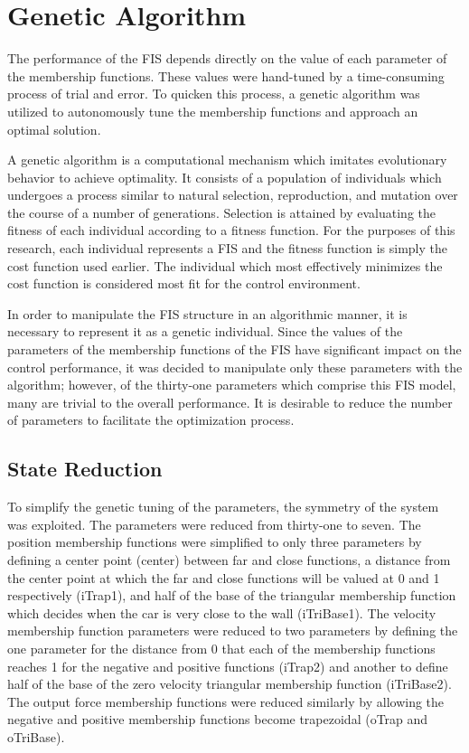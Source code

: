 \section{Genetic Algorithm}\label{s:ga} The performance of the FIS depends directly
on the value of each parameter of the membership functions. These values were hand-tuned by a time-consuming
process of trial and error. To quicken this process, a genetic algorithm was utilized to autonomously tune the
membership functions and approach an optimal solution. 

      A genetic algorithm is a computational mechanism which imitates evolutionary behavior to achieve
      optimality. It consists of a population of individuals which undergoes a process similar to natural
      selection, reproduction, and mutation over the course of a number of generations\cite{cordon:01bk}.
      Selection is attained by evaluating the fitness of each individual according to a fitness function. For
      the purposes of this research, each individual represents a FIS and the fitness function is simply the
      cost function used earlier. The individual which most effectively minimizes the cost function is
      considered most fit for the control environment.
      
      In order to manipulate the FIS structure in an algorithmic manner, it is necessary to represent it as a
      genetic individual. Since the values of the parameters of the membership functions of the FIS have
      significant impact on the control performance, it was decided to manipulate only these parameters with
      the algorithm; however, of the thirty-one parameters which comprise this FIS model, many are trivial to
      the overall performance. It is desirable to reduce the number of parameters to facilitate the
      optimization process.

\subsection{State Reduction} To simplify the genetic tuning of the parameters, the symmetry of the system
was exploited. The parameters were reduced from thirty-one to seven. The position membership functions were
simplified to only three parameters by defining a center point (center) between far and close functions, a
distance from the center point at which the far and close functions will be valued at 0 and 1 respectively
(iTrap1), and half of the base of the triangular membership function which decides when the car is very close
to the wall (iTriBase1). The velocity membership function parameters were reduced to two parameters by
defining the one parameter for the distance from 0 that each of the membership functions reaches 1 for the
negative and positive functions (iTrap2) and another to define half of the base of the zero velocity
triangular membership function (iTriBase2). The output force membership functions were reduced similarly by
allowing the negative and positive membership functions become trapezoidal (oTrap and oTriBase). 

